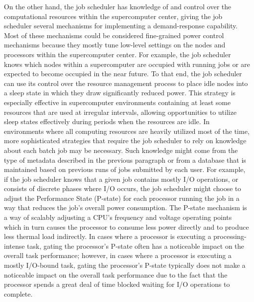 On the other hand, the job scheduler has knowledge of and control over
the computational resources within the supercomputer center, giving
the job scheduler several mechanisms for implementing a
demand-response capability.  Most of these mechanisms could be
considered fine-grained power control mechanisms because they mostly
tune low-level settings on the nodes and processors within the
supercomputer center.  For example, the job scheduler knows which
nodes within a supercomputer are occupied with running jobs or are
expected to become occupied in the near future.  To that end, the job
scheduler can use its control over the resource management process to
place idle nodes into a sleep state in which they draw significantly
reduced power.  This strategy is especially effective in
supercomputer environments containing at least some resources that
are used at irregular intervals, allowing opportunities to utilize
sleep states effectively during periods when the resources are idle.
In environments where all computing resources are heavily utilized
most of the time, more sophisticated strategies that require the job
scheduler to rely on knowledge about each batch job may be necessary.
Such knowledge might come from the type of metadata described in the
previous paragraph or from a database that is maintained based on
previous runs of jobs submitted by each user.  For example, if the job
scheduler knows that a given job contains mostly I/O operations, or
consists of discrete phases where I/O occurs, the job scheduler might
choose to adjust the Performance State (P-state) for each processor
running the job in a way that reduces the job's overall power
consumption.  The P-state mechanism is a way of scalably adjusting a
CPU's frequency and voltage operating points which in turn causes the
processor to consume less power directly and to produce less thermal
load indirectly.  In cases where a processor is executing a
processing-intense task, gating the processor's P-state often has a
noticeable impact on the overall task performance; however, in cases
where a processor is executing a mostly I/O-bound task, gating the
processor's P-state typically does not make a noticeable impact on the
overall task performance due to the fact that the processor spends a
great deal of time blocked waiting for I/O operations to complete.

